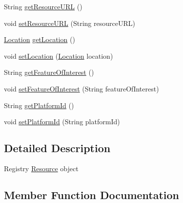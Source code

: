 \begin{DoxyCompactItemize}
\item 
String \hyperlink{classeu_1_1h2020_1_1symbiote_1_1model_1_1Resource_a4a0c05d9007f2216c55ddc32a44f467b}{get\+Resource\+U\+RL} ()
\item 
void \hyperlink{classeu_1_1h2020_1_1symbiote_1_1model_1_1Resource_a27d7401a8087bf902fd575039d574d0c}{set\+Resource\+U\+RL} (String resource\+U\+RL)
\item 
\hyperlink{classeu_1_1h2020_1_1symbiote_1_1model_1_1Location}{Location} \hyperlink{classeu_1_1h2020_1_1symbiote_1_1model_1_1Resource_acfb7ead093f1ed692640c99daba8fc6c}{get\+Location} ()
\item 
void \hyperlink{classeu_1_1h2020_1_1symbiote_1_1model_1_1Resource_a14eba3bd0171783f32d6d4446768905d}{set\+Location} (\hyperlink{classeu_1_1h2020_1_1symbiote_1_1model_1_1Location}{Location} location)
\item 
String \hyperlink{classeu_1_1h2020_1_1symbiote_1_1model_1_1Resource_a1e5912a2e60f0d2dcda674f26ebe871b}{get\+Feature\+Of\+Interest} ()
\item 
void \hyperlink{classeu_1_1h2020_1_1symbiote_1_1model_1_1Resource_abcfd5b3b2e1515ca7e9eb50eeb7ed0cf}{set\+Feature\+Of\+Interest} (String feature\+Of\+Interest)
\item 
String \hyperlink{classeu_1_1h2020_1_1symbiote_1_1model_1_1Resource_a97e847fb787ea9fe1d16d8bd702deece}{get\+Platform\+Id} ()
\item 
void \hyperlink{classeu_1_1h2020_1_1symbiote_1_1model_1_1Resource_a4f3c37b066d6e6587912fa1f1240048f}{set\+Platform\+Id} (String platform\+Id)
\end{DoxyCompactItemize}


\subsection{Detailed Description}
Registry \hyperlink{classeu_1_1h2020_1_1symbiote_1_1model_1_1Resource}{Resource} object 

\subsection{Member Function Documentation}
